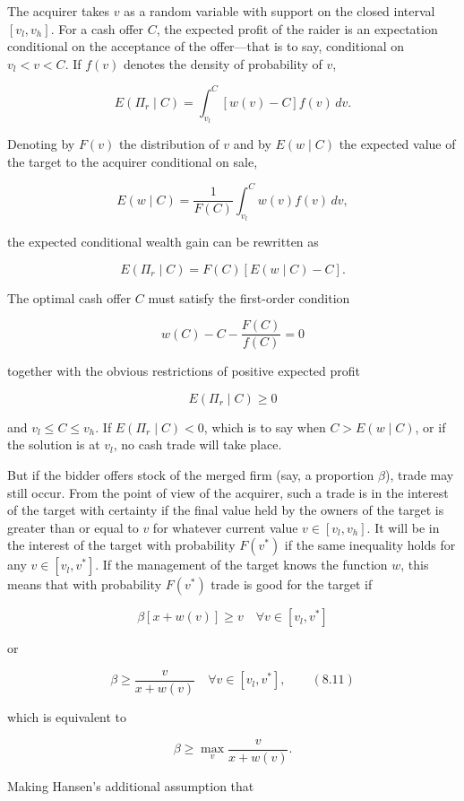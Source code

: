 \documentclass[11pt,a4paper]{article}
\begin{document}
The acquirer takes \(v\) as a random variable with support on the closed interval \([v_l, v_h]\).
For a cash offer \(C\), the expected profit of the raider is an expectation conditional on the
acceptance of the offer---that is to say, conditional on \(v_l < v < C\). If \(f(v)\) denotes the
density of probability of \(v\),

\[E(\Pi_r \mid C) = \int_{v_l}^{C} [w(v) - C] f(v)\, dv.\]

Denoting by \(F(v)\) the distribution of \(v\) and by \(E(w \mid C)\) the expected value of the
target to the acquirer conditional on sale,

\[E(w \mid C) = \frac{1}{F(C)} \int_{v_l}^{C} w(v) f(v)\, dv,\]

the expected conditional wealth gain can be rewritten as

\[E(\Pi_r \mid C) = F(C)[E(w \mid C) - C].\]

The optimal cash offer \(C\) must satisfy the first-order condition

\[w(C) - C - \frac{F(C)}{f(C)} = 0\]

together with the obvious restrictions of positive expected profit

\[E(\Pi_r \mid C) \geq 0\]

and \(v_l \leq C \leq v_h\). If \(E(\Pi_r \mid C) < 0\), which is to say when \(C > E(w \mid C)\),
or if the solution is at \(v_l\), no cash trade will take place.

But if the bidder offers stock of the merged firm (say, a proportion \(\beta\)), trade may still
occur. From the point of view of the acquirer, such a trade is in the interest of the target with
certainty if the final value held by the owners of the target is greater than or equal to \(v\) for
whatever current value \(v \in [v_l, v_h]\). It will be in the interest of the target with
probability \(F(v^*)\) if the same inequality holds for any \(v \in [v_l, v^*]\). If the management
of the target knows the function \(w\), this means that with probability \(F(v^*)\) trade is good
for the target if

\[\beta[x + w(v)] \geq v \quad \forall v \in [v_l, v^*]\]

or

\[\beta \geq \frac{v}{x + w(v)} \quad \forall v \in [v_l, v^*], \qquad (8.11)\]

which is equivalent to

\[\beta \geq \max_v \frac{v}{x + w(v)}.\]

Making Hansen's additional assumption that
\end{document}
